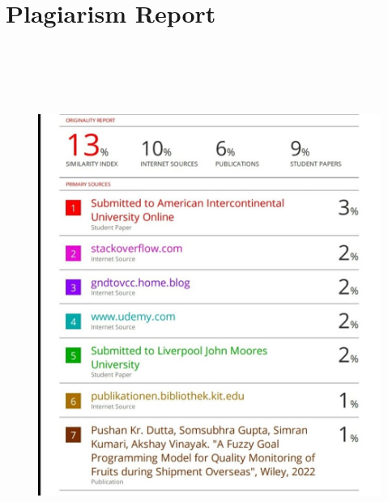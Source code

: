 \documentclass[12 pt]{report}
\begin{document}
\appendix
\chapter{Plagiarism Report}
 \begin{figure}[h!]
 \centering
 \includegraphics[width=14cm,height = 17cm,frame]{images/plag.jpeg}

\end{figure}
\end{document}
